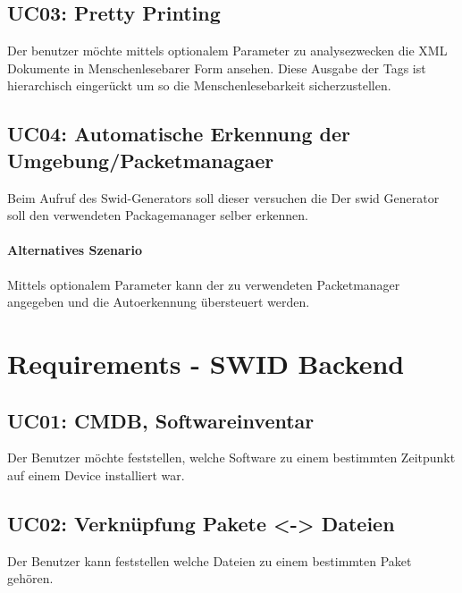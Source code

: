 \subsection*{UC03: Pretty Printing}
Der benutzer möchte mittels optionalem Parameter zu analysezwecken die XML Dokumente in Menschenlesebarer Form ansehen. Diese Ausgabe der Tags ist hierarchisch eingerückt um so die Menschenlesebarkeit sicherzustellen.

\subsection*{UC04: Automatische Erkennung der Umgebung/Packetmanagaer }
Beim Aufruf des Swid-Generators soll dieser versuchen die Der swid Generator soll den verwendeten Packagemanager selber erkennen.
\paragraph{Alternatives Szenario}
Mittels optionalem Parameter kann der zu verwendeten Packetmanager angegeben und die Autoerkennung übersteuert werden.

\section{Requirements - SWID Backend}
\subsection*{UC01: CMDB, Softwareinventar}
Der Benutzer möchte feststellen, welche Software zu einem bestimmten Zeitpunkt auf einem Device installiert war.

\subsection{UC02: Verknüpfung Pakete <-> Dateien}
Der Benutzer kann feststellen welche Dateien zu einem bestimmten Paket gehören.




